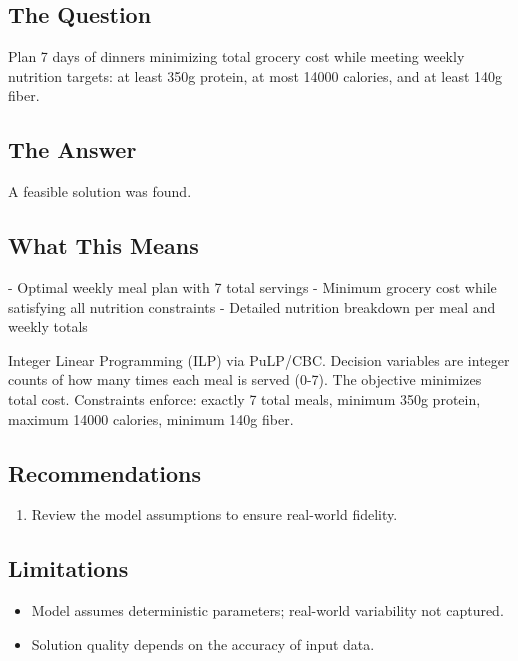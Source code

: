 \documentclass[11pt, a4paper]{article}
\begin{document}
\subsection{The Question}
Plan 7 days of dinners minimizing total grocery cost while meeting weekly nutrition targets: at least 350g protein, at most 14000 calories, and at least 140g fiber.

\subsection{The Answer}

\begin{polyainsight}[title={Bottom Line}]
A feasible solution was found.
\end{polyainsight}

\subsection{What This Means}

- Optimal weekly meal plan with 7 total servings
- Minimum grocery cost while satisfying all nutrition constraints
- Detailed nutrition breakdown per meal and weekly totals

Integer Linear Programming (ILP) via PuLP/CBC. Decision variables are integer counts of how many times each meal is served (0-7). The objective minimizes total cost. Constraints enforce: exactly 7 total meals, minimum 350g protein, maximum 14000 calories, minimum 140g fiber.



\subsection{Recommendations}

\begin{enumerate}
  \item Review the model assumptions to ensure real-world fidelity.
\end{enumerate}

\subsection{Limitations}

\begin{polyawarnbox}
\begin{itemize}
  \item Model assumes deterministic parameters; real-world variability not captured.
  \item Solution quality depends on the accuracy of input data.
\end{itemize}
\end{polyawarnbox}

\end{document}
